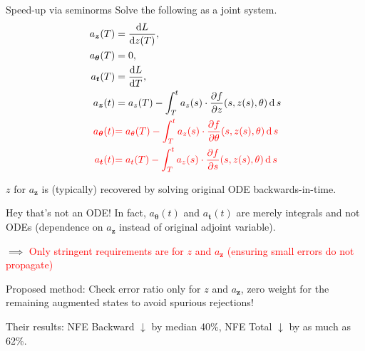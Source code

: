 \documentclass[usenames,dvipsnames]{beamer}
\theoremstyle{definition}
\begin{document}
\begin{frame}{Speed-up via seminorms}
    Solve the following as a joint system.
    $$\begin{aligned}
        a_{\boldsymbol{z}}(T)& =\frac{\mathrm{d}L}{\mathrm{d}z(T)},  \\
        a_{\boldsymbol{\theta}}(T)& =0,  \\
        a_{\boldsymbol{t}}(T)& =\frac{\mathrm{d}L}{\mathrm{d}T},  \\
        a_{\boldsymbol{z}}(t)& =a_z(T)-\int_T^ta_z(s)\cdot\frac{\partial f}{\partial z}(s,z(s),\theta)\operatorname{d}s  \\
        \textcolor{red}{a_{\boldsymbol{\theta}}(t)}& \textcolor{red}{=a_\theta(T)-\int_T^ta_z(s)\cdot\frac{\partial f}{\partial\theta}(s,z(s),\theta)\operatorname{d}s}  \\
        \textcolor{red}{a_{\boldsymbol{t}}(t)}& \textcolor{red}{=a_t(T)-\int_T^ta_z(s)\cdot\frac{\partial f}{\partial s}(s,z(s),\theta)\operatorname{d}s}
    \end{aligned}$$

    $z$ for $a_{\boldsymbol{z}}$ is (typically) recovered by solving original ODE backwards-in-time.

\end{frame}

\begin{frame}{Hey that's not an ODE!}
    In fact, $a_{\boldsymbol{\theta}}(t)$ and $a_{\boldsymbol{t}}(t)$ are merely integrals and not ODEs (dependence on $a_{\boldsymbol{z}}$ instead of original adjoint variable).

    $\implies$ \textcolor{red}{Only stringent requirements are for $z$ and $a_{\boldsymbol{z}}$ (ensuring small errors do not propagate)}

    Proposed method: Check error ratio only for $z$ and $a_{\boldsymbol{z}}$, zero weight for the remaining augmented states to avoid spurious rejections!

    Their results: NFE Backward $\downarrow$ by median 40\%, NFE Total $\downarrow$ by as much as 62\%.
\end{frame}



\end{document}

